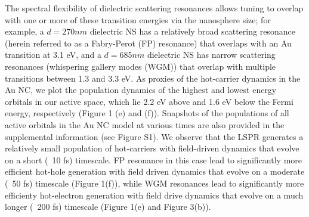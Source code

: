 \documentclass[journal=jpclcd,manuscript=letter]{achemso}
\begin{document}
The spectral flexibility of dielectric scattering
resonances allows tuning to overlap with one or more of these transition energies via the nanosphere size; for example,
a $d=270nm$ dielectric NS has a relatively broad scattering resonance (herein referred to as a Fabry-Perot (FP) resonance) that overlaps 
with an Au transition at 3.1 eV, and
a $d=685nm$ dielectric NS has narrow scattering resonances (whispering gallery modes (WGM)) that overlap with multiple transitions between 1.3 and 3.3 eV.
As proxies of the hot-carrier dynamics in the Au NC, we plot the population dynamics of the highest and lowest energy orbitals in our active space, which lie
2.2 eV above and 1.6 eV below the Fermi energy, respectively (Figure 1 (e) and (f)).  Snapshots of the populations of all active
orbitals in the Au NC model at various times are also provided in the supplemental information (see Figure S1).  
We observe that the LSPR generates a relatively small
population of hot-carriers with field-driven dynamics that evolve on a short (~10 fs) timescale.  FP resonance in this
case lead to significantly more efficient hot-hole generation with field driven dynamics that evolve on a moderate (~50 fs) timescale (Figure 1(f)), while
WGM resonances lead to significantly more efficienty hot-electron generation with field drive dynamics that evolve on a much longer (~200 fs) timescale
(Figure 1(e) and Figure 3(b)).
\end{document}

